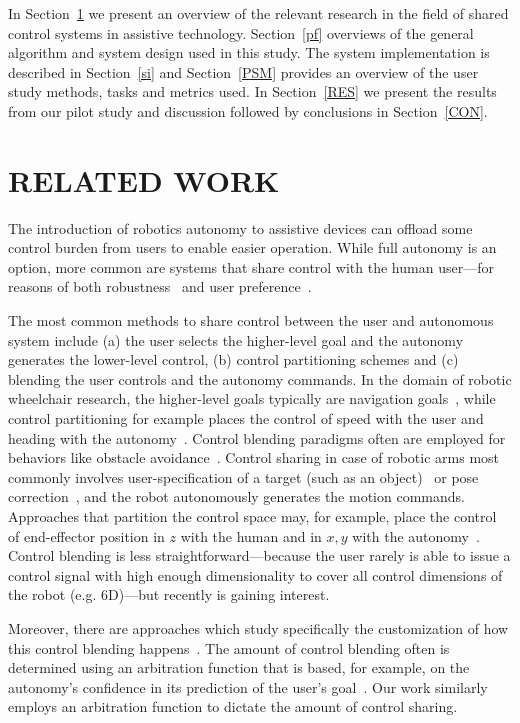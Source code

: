 \documentclass[letterpaper, 10 pt, journal, twoside]{IEEEtran}  %
\begin{document}
	In Section~\ref{rw} we present an overview of the relevant research in
	the field of shared control systems in assistive
	technology. Section~\ref{pf} overviews of the general algorithm and
	system design used in this study. The system implementation is
	described in Section~\ref{si} and Section~\ref{PSM} provides
	an overview of the
	user study methods, tasks and metrics used. 
	In Section~\ref{RES} we present the results from our pilot study and discussion followed by conclusions in Section~\ref{CON}.
	
	\section{RELATED WORK} \label{rw}
	
	
	The introduction of robotics autonomy to assistive devices
	can offload some control burden from users to enable
	easier operation. While full autonomy is an option, more common are systems that share control with the human user---for reasons of both robustness~\cite{05icorr-volosyak} and user preference~\cite{01smc-kim}.
	
	The most common methods to share control
	between the user and autonomous system include (a) the user
	selects the higher-level goal and the autonomy generates
	the lower-level control, (b) control partitioning schemes and (c)
	blending the user controls and the autonomy commands.
	In the domain of robotic wheelchair research, the higher-level goals typically are navigation goals~\cite{05jrrd-simpson}, while control
	partitioning for example places the control of speed with the user
	and heading with the autonomy~\cite{NAVCHAIR}. Control
	blending paradigms often are employed for behaviors like
	obstacle avoidance~\cite{12smc-carlson}. Control sharing in case of robotic arms
	most commonly involves user-specification of a target (such
	as an object)~\cite{jain2010assistive} or pose correction~\cite{04ar-bien}, and the robot autonomously generates the motion commands. 
	Approaches that partition the control space
	may, for example, place the control of end-effector position in
	$z$ with the human and in $x,y$ with the autonomy~\cite{05uais-driessen}.
	Control blending is less straightforward---because the user rarely is able to issue a control signal with high enough dimensionality to cover all control dimensions of the robot (e.g. 6D)---but recently is gaining interest.
	
	Moreover, there are approaches which study specifically the customization of how this control blending happens~\cite{ li2011dynamic}. The amount of control blending often is determined using an arbitration function that is based, for example, on the autonomy's confidence in its prediction of the user's goal~\cite{dragan2012formalizing}. Our work similarly employs an arbitration function to dictate the amount of control sharing. 
	
\end{document}

